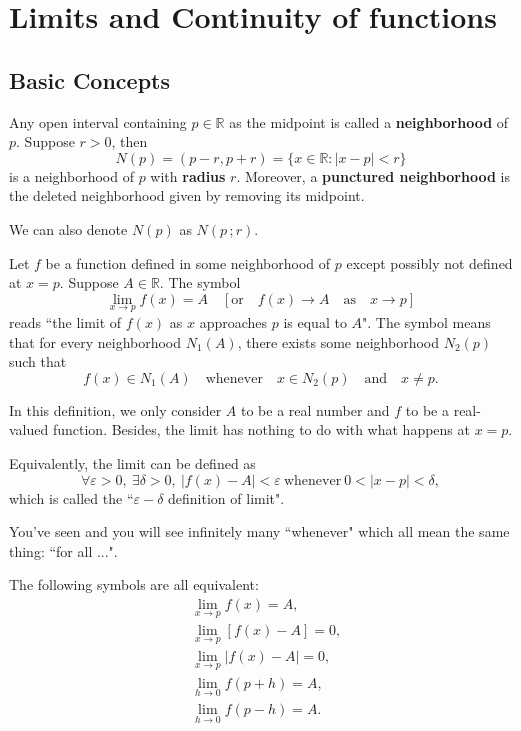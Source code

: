 	\chapter{Limits and Continuity of functions}
	\section{Basic Concepts}
	\begin{definitionenv}
		Any open interval containing $p\in \mathbb{R}$ as the midpoint is called a \textbf{neighborhood} of $p$. Suppose $r>0$, then
		\[
		N(p)=(p-r,p+r)=\{ x\in \mathbb{R} : |x-p|<r \}
		\]
		is a neighborhood of $p$ with \textbf{radius} $r$. Moreover, a \textbf{punctured neighborhood} is the deleted neighborhood given by removing its midpoint.
	\end{definitionenv}
	\begin{notationenv}
		We can also denote $N(p)$ as $N(p\,;r)$.
	\end{notationenv}
	\begin{definitionenv}
		Let $f$ be a function defined in some neighborhood of $p$ except possibly not defined at $x=p$. Suppose $A\in \mathbb{R}$. The symbol
		\[
		\lim_{x\to p} f(x)=A \quad \left[\text{or} \quad f(x)\rightarrow A\quad \text{as}\quad x\to p\right] 
		\]
		reads ``the limit of $f(x)$ as $x$ approaches $p$ is equal to $A$". The symbol means that for every neighborhood $N_1(A)$, there exists some neighborhood $N_2(p)$ such that
		\[
		f(x)\in N_1(A)\quad \text{whenever}\quad x\in N_2(p)\quad \text{and}\quad x\neq p.
		\]
	\end{definitionenv}
	\begin{remarkenv}
		In this definition, we only consider $A$ to be a real number and $f$ to be a real-valued function. Besides, the limit has nothing to do with what happens at $x=p$. 
	\end{remarkenv}
	\begin{definitionenv}
		Equivalently, the limit can be defined as
		\[
		\forall \varepsilon >0,\ \exists \delta>0,\ |f(x)-A|<\varepsilon\ \text{whenever}\ 0<|x-p|<\delta,
		\]
		which is called the ``$\varepsilon-\delta$ definition of limit".
	\end{definitionenv}
	\begin{remarkenv}
		You've seen and you will see infinitely many ``whenever" which all mean the same thing: ``for all ...".
	\end{remarkenv}
	\begin{corollaryenv}
		The following symbols are all equivalent:
		\begin{align*}
			&\lim_{x\to p} f(x)=A, \\
			&\lim_{x\to p} \left[ f(x)-A\right]=0, \\
			&\lim_{x\to p} |f(x)-A|=0,\\
			&\lim_{h\to 0} f(p+h)=A, \\
			&\lim_{h\to 0} f(p-h)=A.
		\end{align*}
	\end{corollaryenv}

